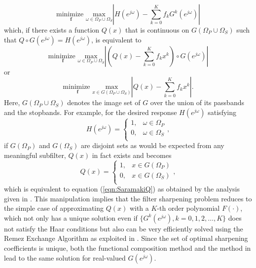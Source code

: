 \documentclass[journal] {IEEEtran}
\begin{document}
\begin{equation}
\underset{\mathbf{f}}{\mbox{minimize }} \underset{\omega\in \Omega_P\cup\Omega_S}{\mbox{max}}\left|H(e^{j\omega})-\sum_{k=0}^K f_k G^k(e^{j\omega})\right|
\end{equation}
which, if there exists a function $Q(x)$ that is continuous on $G(\Omega_P\cup\Omega_S)$ such that $Q\circ G(e^{j\omega})=H(e^{j\omega})$, is equivalent to
\begin{equation}
\underset{\mathbf{f}}{\mbox{minimize }} \underset{\omega\in \Omega_P\cup\Omega_S}{\mbox{max}}\left|\left(Q(x)-\sum_{k=0}^K f_k x^k\right)\circ G(e^{j\omega})\right|
\end{equation}
or
\begin{equation}
\underset{\mathbf{f}}{\mbox{minimize }} \underset{x\in G(\Omega_P\cup\Omega_S)}{\mbox{max}}\left|Q(x)-\sum_{k=0}^K f_k x^k\right|.
\end{equation}
Here, $G(\Omega_P\cup\Omega_S)$ denotes the image set of $G$ over the union of its passbands and the stopbands. For example, for the desired response $H(e^{j\omega})$ satisfying
\begin{equation}\label{eqn:idealH}
H(e^{j\omega})=\left\{\begin{array}{lr}
1, & \omega \in \Omega_P\\
0,&  \omega \in \Omega_S\\
\end{array} \right.,
\end{equation}
if $G(\Omega_P)$ and $G(\Omega_S)$ are disjoint sets as would be expected from any meaningful subfilter, $Q(x)$ in fact exists and becomes
\begin{equation}\label{eqn:myQ}
Q(x)=\left\{\begin{array}{lr}
1, & x \in G(\Omega_P)\\
0,&  x \in G(\Omega_S)\\
\end{array} \right.,
\end{equation}
which is equivalent to equation (\ref{eqn:SaramakiQ}) as obtained by the analysis given in \cite{Saramaki}. This manipulation implies that the filter sharpening problem reduces to the simple case of approximating $Q(x)$ with a $K$-th order polynomial $F(\cdot)$, which not only has a unique solution even if $\{G^k(e^{j\omega}), k=0,1,2,\dots,K\}$ does not satisfy the Haar conditions but also can be very efficiently solved using the Remez Exchange Algorithm as exploited in \cite{Saramaki}. Since the set of optimal sharpening coefficients is unique, both the functional composition method and the method in \cite{Saramaki} lead to the same solution for real-valued $G(e^{j\omega})$.
\end{document}
